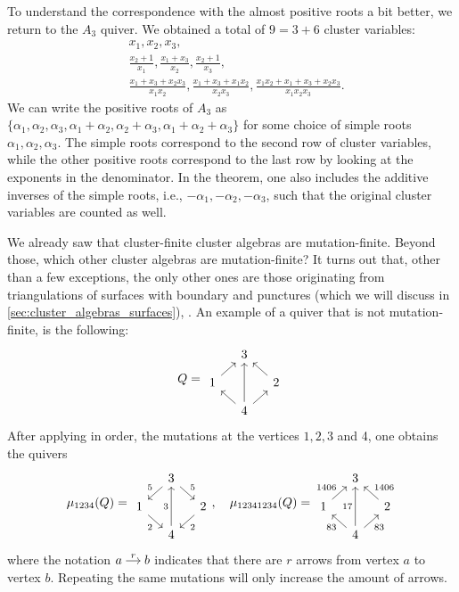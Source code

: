To understand the correspondence with the almost positive roots a bit better, we return
to the $A_3$ quiver. We obtained a total of $9 = 3 + 6$ cluster variables:
\begin{align*}
	 & x_1, x_2, x_3,                                                                                               \\
	 & \frac{x_2 + 1}{x_1}, \frac{x_1 + x_3}{x_2}, \frac{x_2 + 1}{x_3},                                             \\
	 & \frac{x_1+x_3+x_2x_3}{x_1x_2}, \frac{x_1+x_3+x_1x_2}{x_2x_3}, \frac{x_1x_2 + x_1 + x_3 + x_2x_3}{x_1x_2x_3}.
\end{align*}
%
We can write the positive roots of $A_3$ as $\{\alpha_1, \alpha_2, \alpha_3, \alpha_1 +
	\alpha_2, \alpha_2 + \alpha_3, \alpha_1 + \alpha_2 + \alpha_3\}$ for some choice of
simple roots $\alpha_1, \alpha_2, \alpha_3$. The simple roots correspond to the second
row of cluster variables, while the other positive roots correspond to the last row by
looking at the exponents in the denominator. In the theorem, one also includes the
additive inverses of the simple roots, i.e., $-\alpha_1, -\alpha_2, -\alpha_3$, such
that the original cluster variables are counted as well.

We already saw that cluster-finite cluster algebras are mutation-finite. Beyond those,
which other cluster algebras are mutation-finite? It turns out that, other than a few
exceptions, the only other ones are those originating from triangulations of surfaces
with boundary and punctures (which we will discuss in
\cref{sec:cluster_algebras_surfaces}), \parencite{FeliksonShapiroTumarkin2012SkewSCA}. An example of a quiver that is not
mutation-finite, is the following:
\begin{equation*}
	Q =
	\begin{tikzcd}[sep = small]
		& 3 & \\
		1 \urar &&2 \ular \\
		& 4 \ular \ar[uu] \urar
	\end{tikzcd}
\end{equation*}
%
After applying in order, the mutations at the vertices $1,2,3$ and 4, one obtains the
quivers
\begin{equation*}
	\mu_{1234}(Q) =
	\begin{tikzcd}[sep = small]
		& 3 & \\
		1 \urar[leftarrow, "5"] &&2 \ular[leftarrow, "5"'] \\
		& 4 \ular[leftarrow, "2"] \ar[uu, "3"] \urar[leftarrow, "2"']
	\end{tikzcd}
	,\quad \mu_{12341234}(Q) =
	\begin{tikzcd}[sep = small]
		& 3 & \\
		1 \urar["1406"] &&2 \ular["1406"'] \\
		& 4 \ular["83"] \ar[uu, "17"] \urar["83"']
	\end{tikzcd}
\end{equation*}
%
where the notation $\begin{tikzcd}[cramped, sep=small]
		a \ar[r, "r"] &b
	\end{tikzcd}$ indicates that there are $r$ arrows from vertex $a$ to vertex $b$. Repeating the same mutations will only increase the amount of arrows.

